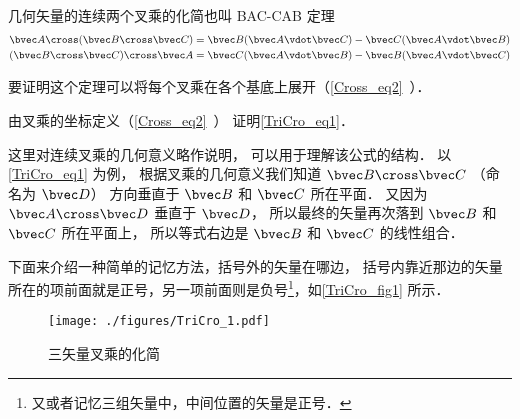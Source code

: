 

几何矢量的连续两个叉乘的化简也叫 BAC-CAB 定理
\begin{gather}
\bvec A \cross (\bvec B \cross \bvec C) = \bvec B (\bvec A \vdot \bvec C) - \bvec C (\bvec A \vdot \bvec B)\label{TriCro_eq1}\\
(\bvec B \cross \bvec C) \cross \bvec A = \bvec C (\bvec A \vdot \bvec B) - \bvec B (\bvec A \vdot \bvec C)
\end{gather}

要证明这个定理可以将每个叉乘在各个基底上展开（\autoref{Cross_eq2}~）．

\begin{exercise}{}
由叉乘的坐标定义（\autoref{Cross_eq2}~） 证明\autoref{TriCro_eq1}．
\end{exercise} 

这里对连续叉乘的几何意义略作说明， 可以用于理解该公式的结构． 以\autoref{TriCro_eq1} 为例， 根据叉乘的几何意义我们知道 $\bvec B \cross \bvec C$ （命名为 $\bvec D$） 方向垂直于 $\bvec B$ 和 $\bvec C$ 所在平面． 又因为 $\bvec A \cross \bvec D$ 垂直于 $\bvec D$， 所以最终的矢量再次落到 $\bvec B$ 和 $\bvec C$ 所在平面上， 所以等式右边是 $\bvec B$ 和 $\bvec C$ 的线性组合．

下面来介绍一种简单的记忆方法，括号外的矢量在哪边， 括号内靠近那边的矢量所在的项前面就是正号，另一项前面则是负号\footnote{又或者记忆三组矢量中，中间位置的矢量是正号．}，如\autoref{TriCro_fig1} 所示．

\begin{figure}[ht]
\centering
\texttt{[image: ./figures/TriCro\_1.pdf]}
\caption{三矢量叉乘的化简}\label{TriCro_fig1}
\end{figure}
